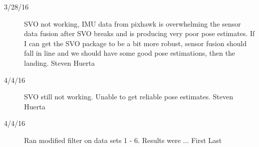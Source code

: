 \begin{description}
\item [3/28/16]  SVO not working, IMU data from pixhawk is overwhelming the sensor data fusion after SVO breaks and is producing very poor pose estimates. If I can get the SVO package to be a bit more robust, sensor fusion should fall in line and we should have some good pose estimations, then the landing. \hfill{Steven Huerta}

\item [4/4/16]  SVO still not working. Unable to get reliable pose estimates.  \hfill{Steven Huerta}

\item [4/4/16]  Ran modified filter on data sets 1 - 6.  Results were ... \hfill{First Last}
\end{description}